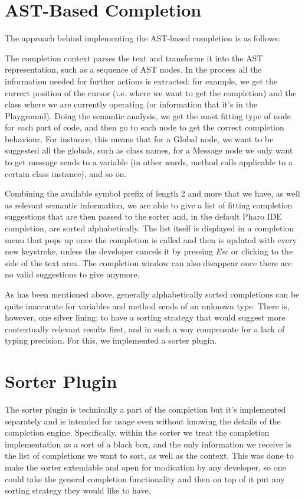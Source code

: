 \section{AST-Based Completion}
The approach behind implementing the AST-based completion is as follows:

The completion context parses the text and transforms it into the AST representation, such as a sequence of AST nodes. In the process all the information needed for further actions is extracted: for example, we get the currect position of the cursor (i.e. where we want to get the completion) and the class where we are currently operating (or information that it's in the Playground). Doing the semantic analysis, we get the most fitting type of node for each part of code, and then go to each node to get the correct completion behaviour. For instance, this means that for a Global node, we want to be suggested all the globals, such as class names, for a Message node we only want to get message sends to a variable (in other words, method calls applicable to a certain class instance), and so on.

Combining the available symbol prefix of length 2 and more that we have, as well as relevant semantic information, we are able to give a list of fitting completion suggestions that are then passed to the sorter and, in the default Pharo IDE completion, are sorted alphabetically. The list itself is displayed in a completion menu that pops up once the completion is called and then is updated with every new keystroke, unless the developer cancels it by pressing \textit{Esc} or clicking to the side of the text area. The completion window can also disappear once there are no valid suggestions to give anymore.

As has been mentioned above, generally alphabetically sorted completions can be quite inaccurate for variables and method sends of an unknown type. There is, however, one silver lining: to have a sorting strategy that would suggest more contextually relevant results first, and in such a way compensate for a lack of typing precision. For this, we implemented a sorter plugin.

\section{Sorter Plugin}
The sorter plugin is technically a part of the completion but it's implemented separately and is intended for usage even without knowing the details of the completion engine. Specifically, within the sorter we treat the completion implementation as a sort of a black box, and the only information we receive is the list of completions we want to sort, as well as the context. This was done to make the sorter extendable and open for modication by any developer, so one could take the general completion functionality and then on top of it put any sorting strategy they would like to have.


